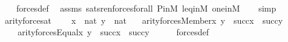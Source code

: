 \begin{isabellebody}
%
\isadelimproof
\ \ %
\endisadelimproof
%
\isatagproof
{}\isamarkupfalse%
\ forces{\isacharunderscore}{\kern0pt}def\ \isamarkupfalse%
\ assms\ sats{\isacharunderscore}{\kern0pt}ren{\isacharunderscore}{\kern0pt}forces{\isacharunderscore}{\kern0pt}forall\ P{\isacharunderscore}{\kern0pt}in{\isacharunderscore}{\kern0pt}M\ leq{\isacharunderscore}{\kern0pt}in{\isacharunderscore}{\kern0pt}M\ one{\isacharunderscore}{\kern0pt}in{\isacharunderscore}{\kern0pt}M\isanewline
\ \ \isamarkupfalse%
\ simp%
\endisatagproof
{\isafoldproof}%
%
\isadelimproof
\isanewline
%
\endisadelimproof
\isanewline
{}\isamarkupfalse%
%
\isadelimdocument
%
\endisadelimdocument
%
\isatagdocument
%
\isamarkuptrue%
%
\endisatagdocument
{\isafolddocument}%
%
\isadelimdocument
%
\endisadelimdocument
{}\isamarkupfalse%
\ arity{\isacharunderscore}{\kern0pt}forces{\isacharunderscore}{\kern0pt}at{\isacharcolon}{\kern0pt}\isanewline
\ \ \ \ {\isachardoublequoteopen}x\ {\isasymin}\ nat{\isachardoublequoteclose}\ {\isachardoublequoteopen}y\ {\isasymin}\ nat{\isachardoublequoteclose}\isanewline
\ \ \ {\isachardoublequoteopen}arity{\isacharparenleft}{\kern0pt}forces{\isacharparenleft}{\kern0pt}Member{\isacharparenleft}{\kern0pt}x{\isacharcomma}{\kern0pt}\ y{\isacharparenright}{\kern0pt}{\isacharparenright}{\kern0pt}{\isacharparenright}{\kern0pt}\ {\isacharequal}{\kern0pt}\ {\isacharparenleft}{\kern0pt}succ{\isacharparenleft}{\kern0pt}x{\isacharparenright}{\kern0pt}\ {\isasymunion}\ succ{\isacharparenleft}{\kern0pt}y{\isacharparenright}{\kern0pt}{\isacharparenright}{\kern0pt}\ {\isacharhash}{\kern0pt}{\isacharplus}{\kern0pt}\ {}{\isachardoublequoteclose}\isanewline
\ \ \ \ {\isachardoublequoteopen}arity{\isacharparenleft}{\kern0pt}forces{\isacharparenleft}{\kern0pt}Equal{\isacharparenleft}{\kern0pt}x{\isacharcomma}{\kern0pt}\ y{\isacharparenright}{\kern0pt}{\isacharparenright}{\kern0pt}{\isacharparenright}{\kern0pt}\ {\isacharequal}{\kern0pt}\ {\isacharparenleft}{\kern0pt}succ{\isacharparenleft}{\kern0pt}x{\isacharparenright}{\kern0pt}\ {\isasymunion}\ succ{\isacharparenleft}{\kern0pt}y{\isacharparenright}{\kern0pt}{\isacharparenright}{\kern0pt}\ {\isacharhash}{\kern0pt}{\isacharplus}{\kern0pt}\ {}{\isachardoublequoteclose}\isanewline
%
\isadelimproof
\ \ %
\endisadelimproof
%
\isatagproof
{}\isamarkupfalse%
\ forces{\isacharunderscore}{\kern0pt}def\isanewline
\ \ \isamarkupfalse%

\end{isabellebody}
